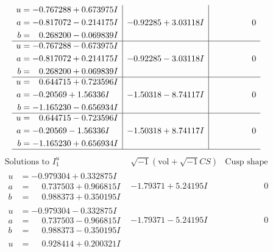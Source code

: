 \documentclass[1p]{elsarticle_modified}
\theoremstyle{definition}
\newcommand{\I}{\sqrt{-1}}
\begin{document}
$$\begin{array}{c|c|c}
\begin{aligned}
u &= -0.767288 + 0.673975 I \\
a &= -0.817072 - 0.214175 I \\
b &= \phantom{-}0.268200 - 0.069839 I\end{aligned}
 & -0.92285 + 3.03118 I & \phantom{-0.000000 } 0 \\ \hline\begin{aligned}
u &= -0.767288 - 0.673975 I \\
a &= -0.817072 + 0.214175 I \\
b &= \phantom{-}0.268200 + 0.069839 I\end{aligned}
 & -0.92285 - 3.03118 I & \phantom{-0.000000 } 0 \\ \hline\begin{aligned}
u &= \phantom{-}0.644715 + 0.723596 I \\
a &= -0.20569 + 1.56336 I \\
b &= -1.165230 - 0.656934 I\end{aligned}
 & -1.50318 - 8.74117 I & \phantom{-0.000000 } 0 \\ \hline\begin{aligned}
u &= \phantom{-}0.644715 - 0.723596 I \\
a &= -0.20569 - 1.56336 I \\
b &= -1.165230 + 0.656934 I\end{aligned}
 & -1.50318 + 8.74117 I & \phantom{-0.000000 } 0\\
 \hline 
 \end{array}$$\newpage$$\begin{array}{c|c|c}  
\text{Solutions to }I^u_{1}& \I (\text{vol} + \sqrt{-1}CS) & \text{Cusp shape}\\
 \hline 
\begin{aligned}
u &= -0.979304 + 0.332875 I \\
a &= \phantom{-}0.737503 + 0.966815 I \\
b &= \phantom{-}0.988373 + 0.350195 I\end{aligned}
 & -1.79371 + 5.24195 I & \phantom{-0.000000 } 0 \\ \hline\begin{aligned}
u &= -0.979304 - 0.332875 I \\
a &= \phantom{-}0.737503 - 0.966815 I \\
b &= \phantom{-}0.988373 - 0.350195 I\end{aligned}
 & -1.79371 - 5.24195 I & \phantom{-0.000000 } 0 \\ \hline\begin{aligned}
u &= \phantom{-}0.928414 + 0.200321 I \\

\end{aligned}
\end{array}$$
\end{document}
